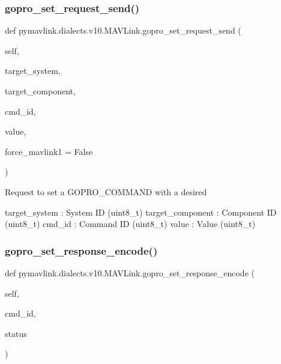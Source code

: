 \begin{DoxyVerb}
\begin{DoxyVerb}
\subsubsection{\texorpdfstring{gopro\+\_\+set\+\_\+request\+\_\+send()}{gopro\_set\_request\_send()}}
{\footnotesize\ttfamily def pymavlink.\+dialects.\+v10.\+M\+A\+V\+Link.\+gopro\+\_\+set\+\_\+request\+\_\+send (\begin{DoxyParamCaption}\item[{}]{self,  }\item[{}]{target\+\_\+system,  }\item[{}]{target\+\_\+component,  }\item[{}]{cmd\+\_\+id,  }\item[{}]{value,  }\item[{}]{force\+\_\+mavlink1 = {\ttfamily False} }\end{DoxyParamCaption})}

\begin{DoxyVerb}Request to set a GOPRO_COMMAND with a desired

target_system             : System ID (uint8_t)
target_component          : Component ID (uint8_t)
cmd_id                    : Command ID (uint8_t)
value                     : Value (uint8_t)\end{DoxyVerb}
 \mbox{\label{classpymavlink_1_1dialects_1_1v10_1_1MAVLink_a1bfe58b9b66dea89abb652de4d3bf018}} 
\subsubsection{\texorpdfstring{gopro\+\_\+set\+\_\+response\+\_\+encode()}{gopro\_set\_response\_encode()}}
{\footnotesize\ttfamily def pymavlink.\+dialects.\+v10.\+M\+A\+V\+Link.\+gopro\+\_\+set\+\_\+response\+\_\+encode (\begin{DoxyParamCaption}\item[{}]{self,  }\item[{}]{cmd\+\_\+id,  }\item[{}]{status }\end{DoxyParamCaption})}


\end{DoxyVerb}
\end{DoxyVerb}
